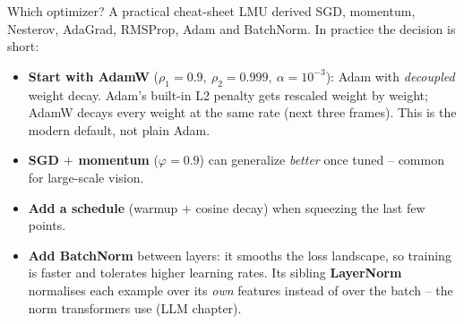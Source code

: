 \documentclass[aspectratio=43]{beamer}
\begin{document}


\begin{frame}{Which optimizer? A practical cheat-sheet}
  LMU derived SGD, momentum, Nesterov, AdaGrad, RMSProp, Adam and BatchNorm. In practice the
  decision is short:
  \vfill
  \begin{itemize}\small
    \item \textbf{Start with AdamW} ($\rho_1{=}0.9,\ \rho_2{=}0.999,\ \alpha{=}10^{-3}$): Adam
      with \emph{decoupled} weight decay. Adam's built-in L2 penalty gets rescaled weight by
      weight; AdamW decays every weight at the same rate (next three frames). This is the modern
      default, not plain Adam.
    \item \textbf{SGD $+$ momentum} ($\varphi{=}0.9$) can generalize \emph{better} once tuned --
      common for large-scale vision.
    \item \textbf{Add a schedule} (warmup $+$ cosine decay) when squeezing the last few points.
    \item \textbf{Add BatchNorm} between layers: it smooths the loss landscape, so training is
      faster and tolerates higher learning rates. Its sibling \textbf{LayerNorm} normalises each
      example over its \emph{own} features instead of over the batch -- the norm transformers
      use (LLM chapter).
  \end{itemize}
  \vfill
\end{frame}
\end{document}
